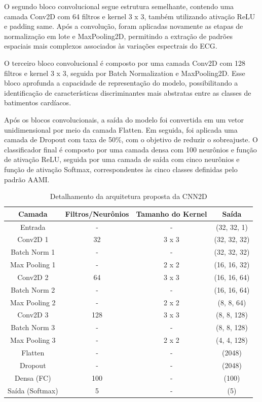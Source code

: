 O segundo bloco convolucional segue estrutura semelhante, contendo uma camada Conv2D com 64 filtros e kernel 3 x 3, também utilizando ativação 
ReLU e padding same. Após a convolução, foram aplicadas novamente as etapas de normalização em lote e MaxPooling2D, permitindo a extração de 
padrões espaciais mais complexos associados às variações espectrais do ECG.

O terceiro bloco convolucional é composto por uma camada Conv2D com 128 filtros e kernel 3 x 3, seguida por Batch Normalization e MaxPooling2D. 
Esse bloco aprofunda a capacidade de representação do modelo, possibilitando a identificação de características discriminantes mais abstratas 
entre as classes de batimentos cardíacos.

Após os blocos convolucionais, a saída do modelo foi convertida em um vetor unidimensional por meio da camada Flatten. Em seguida, foi aplicada 
uma camada de Dropout com taxa de 50\%, com o objetivo de reduzir o sobreajuste. O classificador final é composto por uma camada densa com 
100 neurônios e função de ativação ReLU, seguida por uma camada de saída com cinco neurônios e função de ativação Softmax, correspondentes às 
cinco classes definidas pelo padrão AAMI.

\begin{table}[ht]
  \caption{Detalhamento da arquitetura proposta da CNN2D}
  \label{tab: table4}
  \centering

  \begin{tabular}{cccc}
    \hline
    \bfseries Camada & \bfseries Filtros/Neurônios & \bfseries Tamanho do Kernel & \bfseries Saída\\
    \hline
    Entrada	&	-	&	-	&	(32, 32, 1)\\
    Conv2D 1	&	32	&	3 x 3	&	(32, 32, 32)\\
    Batch Norm 1	&	-	&	-	&	(32, 32, 32)\\
    Max Pooling 1	&	-	&	2 x 2	&	(16, 16, 32)\\
    Conv2D 2	&	64	&	3 x 3	&	(16, 16, 64)\\
    Batch Norm 2	&	-	&	-	&	(16, 16, 64)\\
    Max Pooling 2	&	-	&	2 x 2	&	(8, 8, 64)\\
    Conv2D 3	&	128	&	3 x 3	&	(8, 8, 128)\\
    Batch Norm 3	&	-	&	-	&	(8, 8, 128)\\
    Max Pooling 3	&	-	&	2 x 2	&	(4, 4, 128)\\
    Flatten	&	-	&	-	&	(2048)\\
    Dropout	&	-	&	-	&	(2048)\\
    Densa (FC)	&	100	&	-	&	(100)\\
    Saída (Softmax)	&	5	&	-	&	(5)\\

    \hline
  \end{tabular}

  \source
\end{table}

